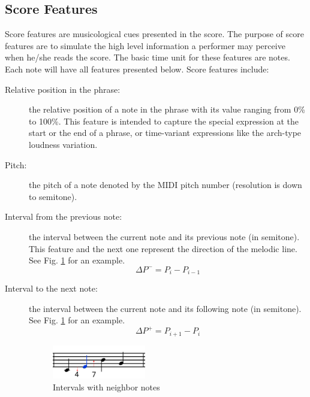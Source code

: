 \subsection{Score Features}
      Score features are musicological cues presented in the score. The purpose of score features are to simulate the high level information a performer may perceive when he/she reads the score. The basic time unit for these features are notes. Each note will have all features presented below.
      Score features include:
      \begin{description}
         \item [Relative position in the phrase:]
            the relative position of a note in the phrase with its value ranging from 0\% to 100\%. %
            This feature is intended to capture the special expression at the start or the end of a phrase, or time-variant expressions like the arch-type loudness variation.
         \item [Pitch:]
            the pitch of a note denoted by the MIDI pitch number (resolution is down to semitone). %

         \item [Interval from the previous note:] the interval between the current note and its previous note (in semitone). This feature and the next one represent the direction of the melodic line. See Fig. \ref{fig:interval} for an example. $$\Delta P^- = P_{i} - P_{i-1} $$ 
         \item [Interval to the next note:] the interval between the current note and its following note (in semitone). See Fig. \ref{fig:interval} for an example. $$\Delta P^+ = P_{i+1} - P_i$$ 
         
      \begin{figure}[tp]
         \begin{center}
            \includegraphics[width=0.4\textwidth]{fig/interval_arrow}
         \end{center}
         \caption{Intervals with neighbor notes}
         \label{fig:interval}
      \end{figure}


\end{description}
